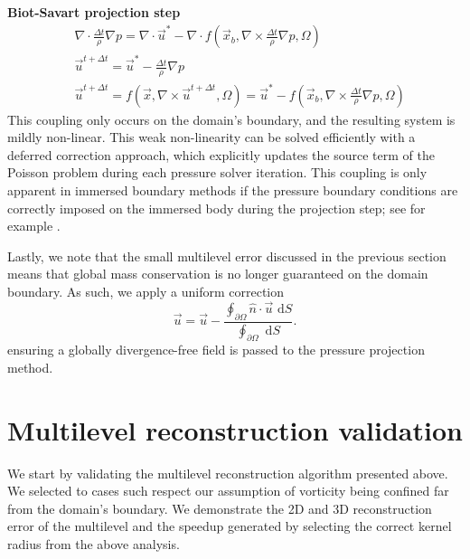 \documentclass[preprint,12pt]{elsarticle}
\begin{document}
\textbf{Biot-Savart projection step}
\begin{align}
    &\nabla\cdot\frac{\Delta t}{\rho}\nabla p = \nabla\cdot \vec{u}^*-\nabla\cdot f(\vec{x}_b,\nabla\times\frac{\Delta t}{\rho}\nabla p,\Omega)\\
    &\vec{u}^{t+\Delta t} = \vec{u}^*-\frac{\Delta t}{\rho}\nabla p\\ 
    &\vec{u}^{t+\Delta t} = f(\vec{x},\nabla\times \vec{u}^{t+\Delta t},\Omega)= \vec{u}^*-f(\vec{x}_b,\nabla\times\frac{\Delta t}{\rho}\nabla p,\Omega)
\end{align}
This coupling only occurs on the domain's boundary, and the resulting system is mildly non-linear. This weak non-linearity can be solved efficiently with a deferred correction approach, which explicitly updates the source term of the Poisson problem during each pressure solver iteration. This coupling is only apparent in immersed boundary methods if the pressure boundary conditions are correctly imposed on the immersed body during the projection step; see for example \cite{Taira2007, Lauber2022}.

Lastly, we note that the small multilevel error discussed in the previous section means that global mass conservation is no longer guaranteed on the domain boundary. As such, we apply a uniform correction
\begin{equation}
    \vec{u} = \vec{u} -\frac {\oint_{\partial\Omega }\hat{n}\cdot\vec{u}\text{ d}S} {\oint_{\partial\Omega }\text{ d}S}.
\end{equation}
ensuring a globally divergence-free field is passed to the pressure projection method.

\section{Multilevel reconstruction validation}

We start by validating the multilevel reconstruction algorithm presented above. We selected to cases such respect our assumption of vorticity being confined far from the domain's boundary. We demonstrate the 2D and 3D reconstruction error of the multilevel and the speedup generated by selecting the correct kernel radius from the above analysis.
\end{document}
